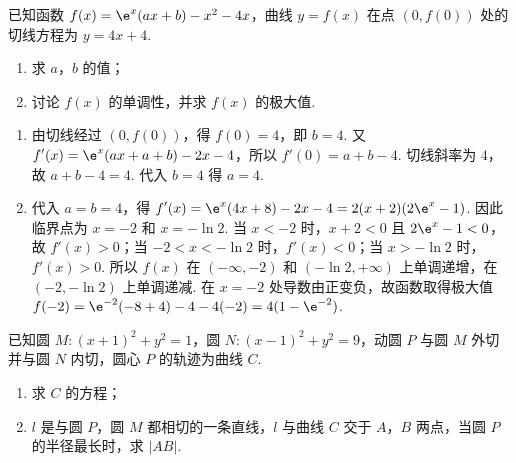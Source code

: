 \begin{problem}
已知函数 \(f(x) = \e^{x}(ax + b) - x^{2} - 4x\)，曲线 \(y = f(x)\) 在点 \((0,f(0))\) 处的切线方程为 \(y = 4x + 4\).
\begin{enumerate}
\item 求 \(a\)，\(b\) 的值；
\item 讨论 \( f(x) \) 的单调性，并求 \( f(x) \) 的极大值.
\end{enumerate}
\end{problem}

\begin{solution}
\begin{enumerate}
\item 由切线经过 \((0,f(0))\)，得 \(f(0)=4\)，即 \(b=4\). 又
\(\displaystyle f'(x)=\e^x(ax+a+b)-2x-4\)，所以 \(f'(0)=a+b-4\). 切线斜率为 \(4\)，故 \(a+b-4=4\). 代入 \(b=4\) 得 \(a=4\).
\item 代入 \(a=b=4\)，得
\(\displaystyle f'(x)=\e^x(4x+8)-2x-4=2(x+2)(2\e^x-1)\). 因此临界点为 \(x=-2\) 和 \(x=-\ln2\). 当 \(x<-2\) 时，\(x+2<0\) 且 \(2\e^x-1<0\)，故 \(f'(x)>0\)；当 \(-2<x<-\ln2\) 时，\(f'(x)<0\)；当 \(x>-\ln2\) 时，\(f'(x)>0\). 所以 \(f(x)\) 在 \((-\infty,-2)\) 和 \((-\ln2,+\infty)\) 上单调递增，在 \((-2,-\ln2)\) 上单调递减. 在 \(x=-2\) 处导数由正变负，故函数取得极大值
\(\displaystyle f(-2)=\e^{-2}(-8+4)-4-4(-2)=4(1-\e^{-2})\).
\end{enumerate}
\end{solution}

\begin{problem}
已知圆 \(M: (x + 1)^2 + y^2 = 1\)，圆 \(N: (x - 1)^2 + y^2 = 9\)，动圆 \(P\) 与圆 \(M\) 外切并与圆 \(N\) 内切，圆心 \(P\) 的轨迹为曲线 \(C\).

\begin{enumerate}
\item 求 \(C\) 的方程；
\item \(l\) 是与圆 \(P\)，圆 \(M\) 都相切的一条直线，\(l\) 与曲线 \(C\) 交于 \(A\)，\(B\) 两点，当圆 \(P\) 的半径最长时，求 \(|AB|\).
\end{enumerate}
\end{problem}

